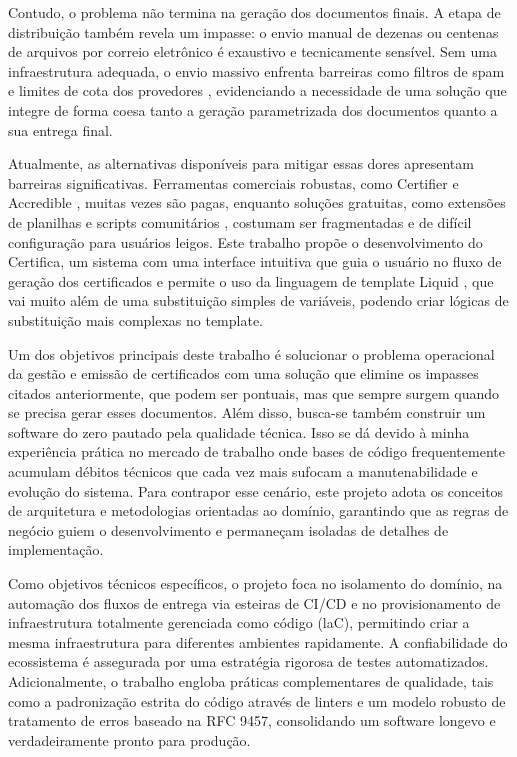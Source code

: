 \documentclass[article,a4paper,12pt,brazil,sumario=tradicional]{abntex2}
\begin{document}
Contudo, o problema não termina na geração dos documentos finais. A etapa de distribuição também revela um impasse: o envio manual de dezenas ou centenas de arquivos por correio eletrônico é exaustivo e tecnicamente sensível. Sem uma infraestrutura adequada, o envio massivo enfrenta barreiras como filtros de spam e limites de cota dos provedores \cite{googlespam2022}, evidenciando a necessidade de uma solução que integre de forma coesa tanto a geração parametrizada dos documentos quanto a sua entrega final.

Atualmente, as alternativas disponíveis para mitigar essas dores apresentam barreiras significativas. Ferramentas comerciais robustas, como Certifier \cite{certifier2024} e Accredible \cite{accredible2024}, muitas vezes são pagas, enquanto soluções gratuitas, como extensões de planilhas e scripts comunitários \cite{autocrat2024}, costumam ser fragmentadas e de difícil configuração para usuários leigos. Este trabalho propõe o desenvolvimento do Certifica, um sistema com uma interface intuitiva que guia o usuário no fluxo de geração dos certificados e permite o uso da linguagem de template Liquid \cite{liquid}, que vai muito além de uma substituição simples de variáveis, podendo criar lógicas de substituição mais complexas no template.

Um dos objetivos principais deste trabalho é solucionar o problema operacional da gestão e emissão de certificados com uma solução que elimine os impasses citados anteriormente, que podem ser pontuais, mas que sempre surgem quando se precisa gerar esses documentos. Além disso, busca-se também construir um software do zero pautado pela qualidade técnica. Isso se dá devido à minha experiência prática no mercado de trabalho onde bases de código frequentemente acumulam débitos técnicos que cada vez mais sufocam a manutenabilidade e evolução do sistema. Para contrapor esse cenário, este projeto adota os conceitos de arquitetura e metodologias orientadas ao domínio, garantindo que as regras de negócio guiem o desenvolvimento e permaneçam isoladas de detalhes de implementação.

Como objetivos técnicos específicos, o projeto foca no isolamento do domínio, na automação dos fluxos de entrega via esteiras de CI/CD e no provisionamento de infraestrutura totalmente gerenciada como código (laC), permitindo criar a mesma infraestrutura para diferentes ambientes rapidamente. A confiabilidade do ecossistema é assegurada por uma estratégia rigorosa de testes automatizados. Adicionalmente, o trabalho engloba práticas complementares de qualidade, tais como a padronização estrita do código através de linters e um modelo robusto de tratamento de erros baseado na RFC 9457, consolidando um software longevo e verdadeiramente pronto para produção.
\end{document}
